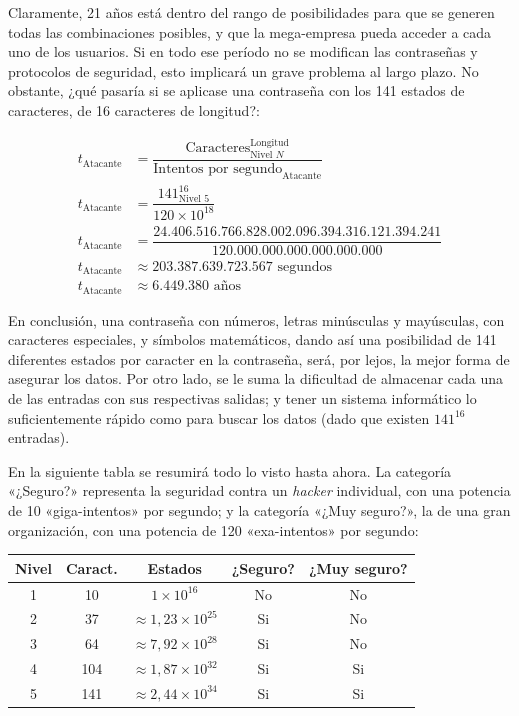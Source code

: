 \documentclass[12pt,a4paper,twoside]{book}
\begin{document}
Claramente, 21 años está dentro del rango de posibilidades para que se generen todas las combinaciones posibles, y que la mega-empresa pueda acceder a cada uno de los usuarios. Si en todo ese período no se modifican las contraseñas y protocolos de seguridad, esto implicará un grave problema al largo plazo. No obstante, ¿qué pasaría si se aplicase una contraseña con los 141 estados de caracteres, de 16 caracteres de longitud?:

\begin{align*}
t_{\text{Atacante}} &= \dfrac{\text{Caracteres}^{\text{Longitud}}_{\text{Nivel } N}}{\text{Intentos por segundo}_\text{Atacante}} \\
t_{\text{Atacante}} &= \dfrac{141^{16}_{\text{Nivel } 5}}{120 \times 10^{18}} \\
t_{\text{Atacante}} &= \dfrac{24.406.516.766.828.002.096.394.316.121.394.241}{120.000.000.000.000.000.000} \\
t_{\text{Atacante}} &\approx 203.387.639.723.567 \text{ segundos} \\
t_{\text{Atacante}} &\approx 6.449.380 \text{ años}
\end{align*}

En conclusión, una contraseña con números, letras minúsculas y mayúsculas, con caracteres especiales, y símbolos matemáticos, dando así una posibilidad de 141 diferentes estados por caracter en la contraseña, será, por lejos, la mejor forma de asegurar los datos. Por otro lado, se le suma la dificultad de almacenar cada una de las entradas con sus respectivas salidas; y tener un sistema informático lo suficientemente rápido como para buscar los datos (dado que existen $ 141^{16} $ entradas).

En la siguiente tabla se resumirá todo lo visto hasta ahora. La categoría «¿Seguro?» representa la seguridad contra un \textit{hacker} individual, con una potencia de 10 «giga-intentos» por segundo; y la categoría «¿Muy seguro?», la de una gran organización, con una potencia de 120 «exa-intentos» por segundo:

\begin{center}
\begin{tabular}{|c|c|c|c|c|}
\hline 
\textbf{Nivel} & \textbf{Caract.} & \textbf{Estados} & \textbf{¿Seguro?} & \textbf{¿Muy seguro?} \\
\hline
1 & 10 & $ 1 \times 10^{16} $ & No & No \\
\hline
2 & 37 & $ \approx 1,23 \times 10^{25} $ & Si & No \\
\hline
3 & 64 & $ \approx 7,92 \times 10^{28} $ & Si & No \\
\hline
4 & 104 & $ \approx 1,87 \times 10^{32} $ & Si & Si \\
\hline
5 & 141 & $ \approx 2,44 \times 10^{34} $ & Si & Si \\
\hline
\end{tabular}
\end{center}
\end{document}

